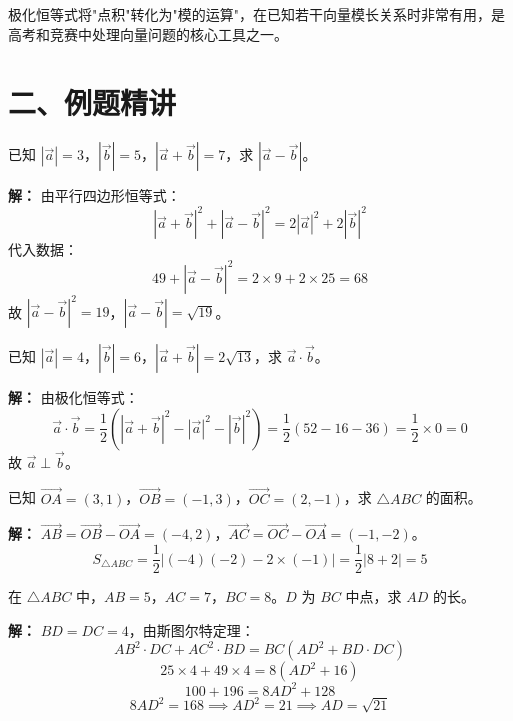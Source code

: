 \documentclass[12pt, a4paper]{ctexart}
\begin{document}
\begin{tipbox}[极化恒等式的作用]
极化恒等式将"点积"转化为"模的运算"，在已知若干向量模长关系时非常有用，是高考和竞赛中处理向量问题的核心工具之一。
\end{tipbox}

\section*{\textcolor{examorange}{二、例题精讲}}

\begin{examplebox}[【例题1】平行四边形恒等式的直接应用]
已知 $|\vec{a}|=3$，$|\vec{b}|=5$，$|\vec{a}+\vec{b}|=7$，求 $|\vec{a}-\vec{b}|$。
\end{examplebox}

\textbf{解：} 由平行四边形恒等式：
\[
|\vec{a}+\vec{b}|^2 + |\vec{a}-\vec{b}|^2 = 2|\vec{a}|^2 + 2|\vec{b}|^2
\]
代入数据：
\[
49 + |\vec{a}-\vec{b}|^2 = 2 \times 9 + 2 \times 25 = 68
\]
故 $|\vec{a}-\vec{b}|^2 = 19$，$|\vec{a}-\vec{b}| = \sqrt{19}$。

\begin{examplebox}[【例题2】极化恒等式求点积]
已知 $|\vec{a}|=4$，$|\vec{b}|=6$，$|\vec{a}+\vec{b}|=2\sqrt{13}$，求 $\vec{a}\cdot\vec{b}$。
\end{examplebox}

\textbf{解：} 由极化恒等式：
\[
\vec{a}\cdot\vec{b} = \frac{1}{2}\left(|\vec{a}+\vec{b}|^2 - |\vec{a}|^2 - |\vec{b}|^2\right)
= \frac{1}{2}(52 - 16 - 36) = \frac{1}{2} \times 0 = 0
\]
故 $\vec{a} \perp \vec{b}$。

\begin{examplebox}[【例题3】叉积求三角形面积]
已知 $\vec{OA} = (3, 1)$，$\vec{OB} = (-1, 3)$，$\vec{OC} = (2, -1)$，求 $\triangle ABC$ 的面积。
\end{examplebox}

\textbf{解：} $\vec{AB} = \vec{OB} - \vec{OA} = (-4, 2)$，$\vec{AC} = \vec{OC} - \vec{OA} = (-1, -2)$。
\[
S_{\triangle ABC} = \frac{1}{2}|(-4)(-2) - 2 \times (-1)| = \frac{1}{2}|8+2| = 5
\]

\begin{examplebox}[【例题4】斯图尔特定理应用]
在 $\triangle ABC$ 中，$AB=5$，$AC=7$，$BC=8$。$D$ 为 $BC$ 中点，求 $AD$ 的长。
\end{examplebox}

\textbf{解：} $BD = DC = 4$，由斯图尔特定理：
\[
AB^2 \cdot DC + AC^2 \cdot BD = BC(AD^2 + BD \cdot DC)
\]
\[
25 \times 4 + 49 \times 4 = 8(AD^2 + 16)
\]
\[
100 + 196 = 8AD^2 + 128
\]
\[
8AD^2 = 168 \implies AD^2 = 21 \implies AD = \sqrt{21}
\]
\end{document}
